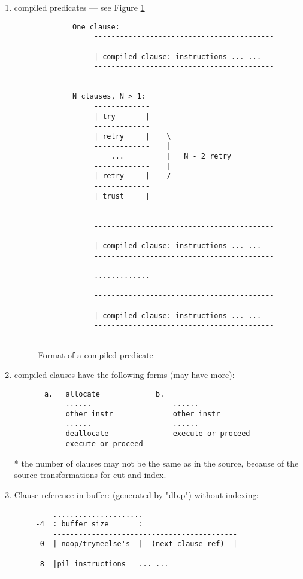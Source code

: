 \documentclass[11pt]{article}
\begin{document}
\begin{enumerate}
    \item compiled predicates --- see Figure \ref{f:cmppred}

\begin{figure}
\begin{verbatim}
        One clause:
             -------------------------------------------
             | compiled clause: instructions ... ...
             -------------------------------------------
   
        N clauses, N > 1:
             -------------
             | try       |
             -------------
             | retry     |    \
             -------------    |
                 ...          |   N - 2 retry
             -------------    |
             | retry     |    /
             -------------
             | trust     |
             -------------

             -------------------------------------------
             | compiled clause: instructions ... ...
             -------------------------------------------
             .............

             -------------------------------------------
             | compiled clause: instructions ... ...
             -------------------------------------------
\end{verbatim}
\caption{Format of a compiled predicate}
\label{f:cmppred}
\end{figure}

    \item compiled clauses have the following forms (may have more):
\begin{verbatim}
       a.   allocate             b.
            ......                   ......
            other instr              other instr
            ......                   ......
            deallocate               execute or proceed
            execute or proceed
\end{verbatim}

   * the number of clauses may not be the same as in the source,
     because of the source transformations for cut and index.

    \item Clause reference in buffer: (generated by "db.p")
\label{pg:clauseref}
        without indexing:

\begin{verbatim}
         .....................
     -4  : buffer size       :
         -------------------------------------------
      0  | noop/trymeelse's  |  (next clause ref)  |
         ------------------------------------------------
      8  |pil instructions   ... ...
         ------------------------------------------------
\end{verbatim}


\end{enumerate}
\end{document}
